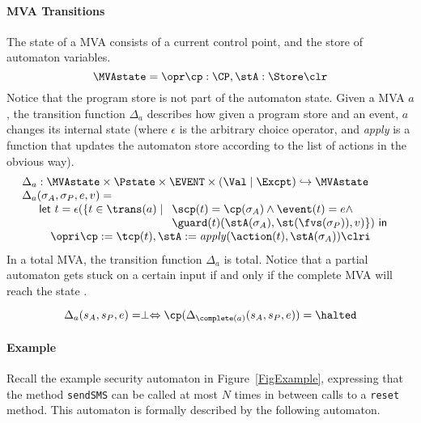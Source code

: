\paragraph{MVA Transitions} The state of a MVA consists of a current control
point, and the store of automaton variables.
\[
\MVAstate = \opr \cp : \CP, \stA : \Store \clr
\]
Notice that the program store is not part of the automaton
state. Given a MVA \(a\), the transition function \(\Delta_a\)
describes how given a program store and an event, \(a\) changes its
internal state (where \(\epsilon\) is the arbitrary choice operator,
and \textit{apply} is a function that updates the automaton store
according to the list of actions in the obvious way).
\[
\begin{array}{l}
\Delta_a  :  \MVAstate \times \Pstate \times \EVENT \times (\Val \mid
\Excpt) \hookrightarrow
\MVAstate\\
\Delta_a(\sigma_A, \sigma_P, e, v) = \\
\quad
\begin{array}[t]{l}
\mathsf{let\ }t = \epsilon(\{t\in \trans(a)\mid
  \begin{array}[t]{l}
     \scp(t) = \cp(\sigma_A) \wedge \event(t) = e \wedge \\
     \guard(t)(\stA(\sigma_A), \st(\fvs(\sigma_P)), v)\}) \mathsf{\ in}
  \end{array}\\
\quad \opri \cp := \tcp(t), \stA := \mathit{apply}(\action(t),
\stA(\sigma_A)) \clri
\end{array}

\end{array}
\]
In a total MVA, the transition function \(\Delta_a\) is total. Notice
that a partial automaton gets stuck on a certain input if and only if the
complete MVA will reach the state \halted.

\begin{equation}
\Delta_a(s_A, s_P, e) = \perp \Leftrightarrow
\cp (\Delta_{\complete(a)}(s_A, s_P, e)) = \halted
\end{equation}


\paragraph{Example}
Recall the example security automaton in Figure~\ref{FigExample},
expressing that the method \texttt{sendSMS} can
be called at most \(N\) times in between calls to a \texttt{reset}
method. This automaton is formally described by the following
automaton.

